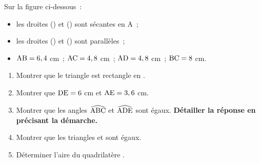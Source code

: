 \documentclass[exercice]{thedocument}%
\begin{document}
%
    Sur la figure ci-dessous~:
    \begin{itemize}
        \item les droites () et ()
        sont sécantes en A~;
        \item les droites () et ()
        sont parallèles~;
        \item $\text{AB} =6,4$ cm~; $\text{AC}=4,8$ cm~;
        $\text{AD}=4,8$ cm~; $\text{BC}=8$ cm.
    \end{itemize}
    \begin{center}
    \end{center}
    \begin{enumerate}
        \item Montrer que le triangle  est
        rectangle en .
        \item Montrer que $\text{DE} = 6$ cm et
        $\text{AE}=3,6$ cm.
        \item Montrer que les angles $\widehat{\text{ABC}}$
        et $\widehat{\text{ADE}}$ sont égaux.
        \textbf{Détailler la réponse en précisant la démarche.}
        \item Montrer que les triangles  et
         sont égaux.
        \item Déterminer l'aire du quadrilatère .
    \end{enumerate}
    \showthesource
\end{document}
